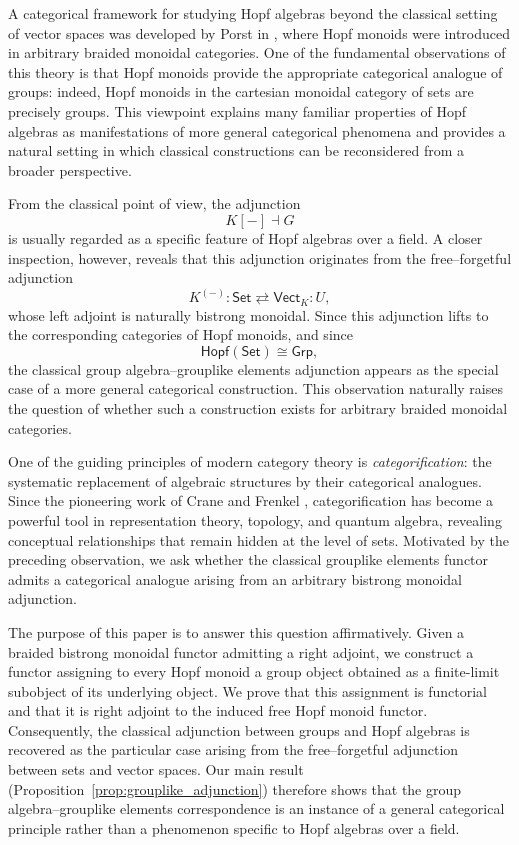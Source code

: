 \documentclass{amsart}
\newcommand{\Set}{\mathsf{Set}}
\newcommand{\Vect}{\mathsf{Vect}}
\newcommand{\Grp}{\mathsf{Grp}}
\newcommand{\VectK}{\Vect_K}
\begin{document}
A categorical framework for studying Hopf algebras beyond the classical setting of vector spaces was developed by Porst in \cite{FT}, where Hopf monoids were introduced in arbitrary braided monoidal categories. One of the fundamental observations of this theory is that Hopf monoids provide the appropriate categorical analogue of groups: indeed, Hopf monoids in the cartesian monoidal category of sets are precisely groups. This viewpoint explains many familiar properties of Hopf algebras as manifestations of more general categorical phenomena and provides a natural setting in which classical constructions can be reconsidered from a broader perspective.

From the classical point of view, the adjunction
\[
K[-]\dashv G
\]
is usually regarded as a specific feature of Hopf algebras over a field. A closer inspection, however, reveals that this adjunction originates from the free--forgetful adjunction
\[
K^{(-)}:\Set\rightleftarrows\VectK:U,
\]
whose left adjoint is naturally bistrong monoidal. Since this adjunction lifts to the corresponding categories of Hopf monoids, and since
\[
\mathsf{Hopf}(\Set)\cong\Grp,
\]
the classical group algebra--grouplike elements adjunction appears as the special case of a more general categorical construction. This observation naturally raises the question of whether such a construction exists for arbitrary braided monoidal categories.

One of the guiding principles of modern category theory is \emph{categorification}: the systematic replacement of algebraic structures by their categorical analogues. Since the pioneering work of Crane and Frenkel \cite{CraneFrenkel}, categorification has become a powerful tool in representation theory, topology, and quantum algebra, revealing conceptual relationships that remain hidden at the level of sets. Motivated by the preceding observation, we ask whether the classical grouplike elements functor admits a categorical analogue arising from an arbitrary bistrong monoidal adjunction.

The purpose of this paper is to answer this question affirmatively. Given a braided bistrong monoidal functor admitting a right adjoint, we construct a functor assigning to every Hopf monoid a group object obtained as a finite-limit subobject of its underlying object. We prove that this assignment is functorial and that it is right adjoint to the induced free Hopf monoid functor. Consequently, the classical adjunction between groups and Hopf algebras is recovered as the particular case arising from the free--forgetful adjunction between sets and vector spaces. Our main result (Proposition~\ref{prop:grouplike_adjunction}) therefore shows that the group algebra--grouplike elements correspondence is an instance of a general categorical principle rather than a phenomenon specific to Hopf algebras over a field.
\end{document}
